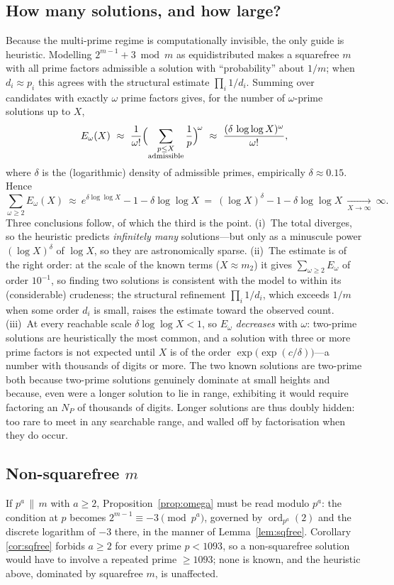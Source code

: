 \documentclass[11pt,reqno]{amsart}
\theoremstyle{plain}
\theoremstyle{definition}
\theoremstyle{remark}
\newcommand{\ord}{\operatorname{ord}}
\begin{document}
\subsection{How many solutions, and how large?}
Because the multi-prime regime is computationally invisible, the only guide is heuristic.
Modelling $2^{m-1}+3\bmod m$ as equidistributed makes a squarefree $m$ with all prime factors
admissible a solution with ``probability'' about $1/m$; when $d_{i}\approx p_{i}$ this agrees
with the structural estimate $\prod_{i}1/d_{i}$. Summing over candidates with exactly $\omega$
prime factors gives, for the number of $\omega$-prime solutions up to $X$,
\[
E_{\omega}(X)\ \approx\ \frac{1}{\omega!}\Bigl(\sum_{\substack{p\le X\\\text{admissible}}}
\frac{1}{p}\Bigr)^{\!\omega}\ \approx\ \frac{(\delta\,\log\log X)^{\omega}}{\omega!},
\]
where $\delta$ is the (logarithmic) density of admissible primes, empirically
$\delta\approx 0.15$. Hence
\[
\sum_{\omega\ge 2}E_{\omega}(X)\ \approx\ e^{\delta\log\log X}-1-\delta\log\log X
\ =\ (\log X)^{\delta}-1-\delta\log\log X\ \xrightarrow[X\to\infty]{}\ \infty.
\]
Three conclusions follow, of which the third is the point. (i)~The total diverges, so the
heuristic predicts \emph{infinitely many} solutions---but only as a minuscule power
$(\log X)^{\delta}$ of $\log X$, so they are astronomically sparse. (ii)~The estimate is of the
right order: at the scale of the known terms ($X\approx m_{2}$) it gives $\sum_{\omega\ge 2}
E_{\omega}$ of order $10^{-1}$, so finding two solutions is consistent with the model to within
its (considerable) crudeness; the structural refinement $\prod_{i}1/d_{i}$, which exceeds $1/m$
when some order $d_{i}$ is small, raises the estimate toward the observed count. (iii)~At every
reachable scale $\delta\log\log X<1$, so $E_{\omega}$ \emph{decreases} with $\omega$: two-prime
solutions are heuristically the most common, and a solution with three or more prime factors is
not expected until $X$ is of the order $\exp\!\bigl(\exp(c/\delta)\bigr)$---a number with
thousands of digits or more. The two known solutions are two-prime both because two-prime
solutions genuinely dominate at small heights and because, even were a longer solution to lie in
range, exhibiting it would require factoring an $N_{P}$ of thousands of digits. Longer solutions
are thus doubly hidden: too rare to meet in any searchable range, and walled off by
factorisation when they do occur.

\subsection{Non-squarefree \texorpdfstring{$m$}{m}}
If $p^{a}\,\|\,m$ with $a\ge 2$, Proposition~\ref{prop:omega} must be read modulo $p^{a}$: the
condition at $p$ becomes $2^{m-1}\equiv-3\pmod{p^{a}}$, governed by $\ord_{p^{a}}(2)$ and the
discrete logarithm of $-3$ there, in the manner of Lemma~\ref{lem:sqfree}. Corollary
\ref{cor:sqfree} forbids $a\ge 2$ for every prime $p<1093$, so a non-squarefree solution would
have to involve a repeated prime $\ge 1093$; none is known, and the heuristic above, dominated by
squarefree $m$, is unaffected.
\end{document}
